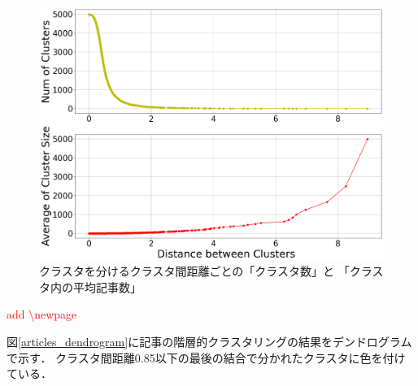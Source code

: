 \documentclass[12pt,a4j]{jreport}
\begin{document}
\begin{figure}[H]
	\centering
	\includegraphics[keepaspectratio, width=120mm]{img/process-06_articles-cluster_threshold-dependencies_reduced-data-to-5000_edit-label_Trim.png}
	\caption{クラスタを分けるクラスタ間距離ごとの「クラスタ数」と
  「クラスタ内の平均記事数」}
	\label{num_and_size_of_clusters_of_articles}
\end{figure}

\textcolor{red}{add \textbackslash newpage}
\newpage

図\ref{articles_dendrogram}に記事の階層的クラスタリングの結果をデンドログラムで示す．
クラスタ間距離0.85以下の最後の結合で分かれたクラスタに色を付けている．
\end{document}
